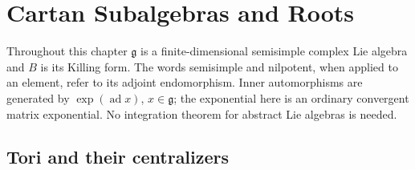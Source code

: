\chapter{Cartan Subalgebras and Roots}
\label{ch:roots}

Throughout this chapter \(\mathfrak g\) is a finite-dimensional
semisimple complex Lie algebra and \(B\) is its Killing form.
The words semisimple and nilpotent, when applied to an element, refer
to its adjoint endomorphism. Inner automorphisms are generated by
\(\exp(\operatorname{ad}x)\), \(x\in\mathfrak g\); the exponential here
is an ordinary convergent matrix exponential. No integration theorem
for abstract Lie algebras is needed.

\section{Tori and their centralizers}

